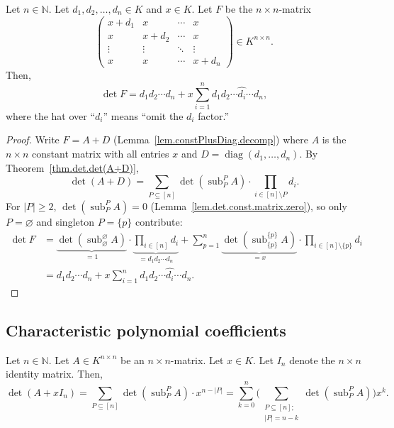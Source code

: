 \begin{proposition}
\label{prop.det.x+ai}
\leantarget
\leanok
Let $n\in\mathbb{N}$. Let $d_1,d_2,\ldots,d_n\in K$ and $x\in K$.
Let $F$ be the $n\times n$-matrix
\[
\begin{pmatrix}
x+d_1 & x & \cdots & x\\
x & x+d_2 & \cdots & x\\
\vdots & \vdots & \ddots & \vdots\\
x & x & \cdots & x+d_n
\end{pmatrix}\in K^{n\times n}.
\]
Then,
\[
\det F = d_1 d_2 \cdots d_n
+ x \sum_{i=1}^n d_1 d_2 \cdots \widehat{d_i} \cdots d_n,
\]
where the hat over ``$d_i$'' means ``omit the $d_i$ factor.''
\end{proposition}

\begin{proof}
Write $F = A + D$ (Lemma~\ref{lem.constPlusDiag.decomp}) where $A$ is the $n\times n$ constant matrix with
all entries $x$ and $D = \operatorname{diag}(d_1,\ldots,d_n)$.
By Theorem~\ref{thm.det.det(A+D)},
\[
\det(A+D) = \sum_{P\subseteq [n]}
\det(\operatorname{sub}_P^P A) \cdot \prod_{i\in [n]\setminus P} d_i.
\]
For $|P|\ge 2$, $\det(\operatorname{sub}_P^P A) = 0$
(Lemma~\ref{lem.det.const.matrix.zero}), so only $P=\varnothing$ and
singleton $P=\{p\}$ contribute:
\begin{align*}
\det F
&= \underbrace{\det(\operatorname{sub}_{\varnothing}^{\varnothing} A)}_{=1}
\cdot \underbrace{\prod_{i\in [n]} d_i}_{=d_1 d_2\cdots d_n}
+ \sum_{p=1}^{n}
\underbrace{\det(\operatorname{sub}_{\{p\}}^{\{p\}} A)}_{=x}
\cdot \prod_{i\in [n]\setminus\{p\}} d_i \\
&= d_1 d_2 \cdots d_n + x \sum_{i=1}^n
d_1 d_2 \cdots \widehat{d_i} \cdots d_n.
\end{align*}
\end{proof}

\subsection{Characteristic polynomial coefficients}

\begin{proposition}
\label{prop.det.charpol-explicit}
\leantarget
\leanok
Let $n\in\mathbb{N}$. Let $A\in K^{n\times n}$ be an $n\times n$-matrix.
Let $x\in K$. Let $I_n$ denote the $n\times n$ identity matrix. Then,
\[
\det(A + x I_n)
= \sum_{P\subseteq [n]}
\det(\operatorname{sub}_P^P A) \cdot x^{n-|P|}
= \sum_{k=0}^{n}
\biggl(\sum_{\substack{P\subseteq [n];\\ |P|=n-k}}
\det(\operatorname{sub}_P^P A)\biggr) x^k.
\]
\end{proposition}

